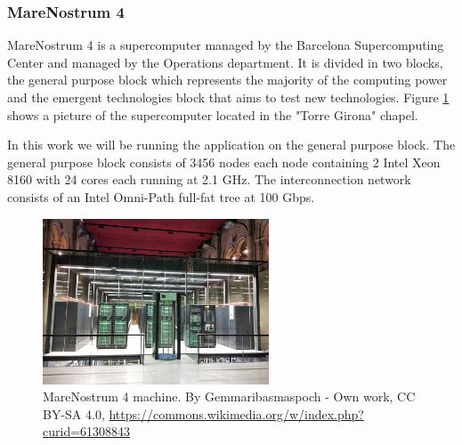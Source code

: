 %
%
%
\subsubsection{MareNostrum 4}

\justify
MareNostrum 4\cite{mn4} is a supercomputer managed by the Barcelona Supercomputing Center and managed by the Operations department. It is divided in two blocks, the general purpose block which represents the majority of the computing power and the emergent technologies block that aims to test new technologies. Figure \ref{fig:mn4} shows a picture of the supercomputer located in the "Torre Girona" chapel.

\justify
In this work we will be running the application on the general purpose block.
The general purpose block consists of 3456 nodes each node containing 2 Intel Xeon 8160 with 24 cores each running at 2.1 GHz. The interconnection network consists of an Intel Omni-Path full-fat tree at 100 Gbps.

\begin{figure}[htbp]
  \centering
  \includegraphics[width=0.6\textwidth]{mn4}
  \caption{MareNostrum 4 machine. {By Gemmaribasmaspoch - Own work, CC BY-SA 4.0, \url{https://commons.wikimedia.org/w/index.php?curid=61308843}}}
  \label{fig:mn4}
\end{figure}

